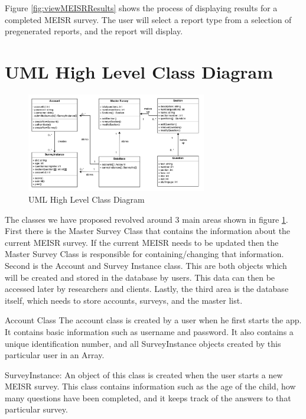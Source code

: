  Figure \ref{fig:viewMEISRResults} shows the process of displaying results for a completed MEISR survey. The user will select a report type from a selection of pre\-generated reports, and the report will display.
  
\section{UML High Level Class Diagram}

\begin{figure}[h]
  \centering
  \includegraphics[width=0.7\textwidth]{images/HighLevelClassDiagramCS495.png}
  \caption{UML High Level Class Diagram}
  \label{fig:classDiagram}
\end{figure}

The classes we have proposed revolved around 3 main areas shown in figure \ref{fig:classDiagram}. First there is the Master Survey Class that contains the information about the current MEISR survey. If the current MEISR needs to be updated then the Master Survey Class is responsible for containing/changing that information. Second is the Account and Survey Instance class. This are both objects which will be created and stored in the database by users. This data can then be accessed later by researchers and clients. Lastly, the third area is the database itself, which needs to store accounts, surveys, and the master list.


Account Class
	The account class is created by a user when he first starts the app. It contains basic information such as username and password. It also contains a unique identification number, and all SurveyInstance objects created by this particular user in an Array.

SurveyInstance:
	An object of this class is created when the user starts a new MEISR survey. This class contains information such as the age of the child, how many questions have been completed, and it keeps track of the answers to that particular survey.

